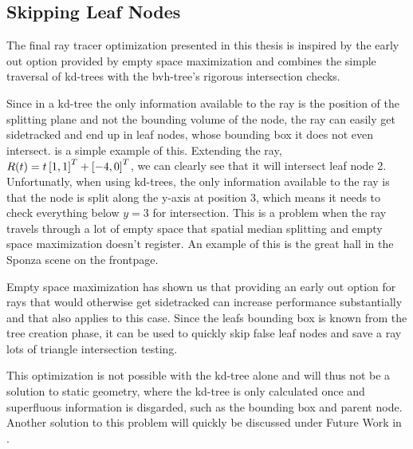 \subsection{Skipping Leaf Nodes}


The final ray tracer optimization presented in this thesis is inspired
by the early out option provided by empty space maximization and
combines the simple traversal of kd-trees with the bvh-tree's rigorous
intersection checks.

Since in a kd-tree the only information available to the ray is the
position of the splitting plane and not the bounding volume of the
node, the ray can easily get sidetracked and end up in leaf nodes,
whose bounding box it does not even intersect. 
is a simple example of this. Extending the ray, $R(t) = t
\left[1, 1 \right]^T + \left[-4, 0 \right]^T$, we can clearly see that it will
intersect leaf node 2. Unfortunatly, when using kd-trees, the only
information available to the ray is that the node is split along the
y-axis at position 3, which means it needs to check everything below
$y=3$ for intersection. This is a problem when the ray travels through
a lot of empty space that spatial median splitting and empty space
maximization doesn't register. An example of this is the great hall in
the Sponza scene on the frontpage.

Empty space maximization has shown us that providing an early out
option for rays that would otherwise get sidetracked can increase
performance substantially and that also applies to this case. Since
the leafs bounding box is known from the tree creation phase, it can
be used to quickly skip false leaf nodes and save a ray lots of
triangle intersection testing.

This optimization is not possible with the kd-tree alone and will thus
not be a solution to static geometry, where the kd-tree is only
calculated once and superfluous information is disgarded, such as the
bounding box and parent node. Another solution to this problem will
quickly be discussed under Future Work in .


